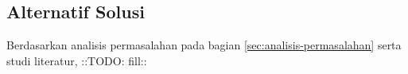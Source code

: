 \subsection{Alternatif Solusi}
\label{sec:analisis-solusi}

Berdasarkan analisis permasalahan pada bagian \ref{sec:analisis-permasalahan} serta studi literatur, ::TODO: fill::
